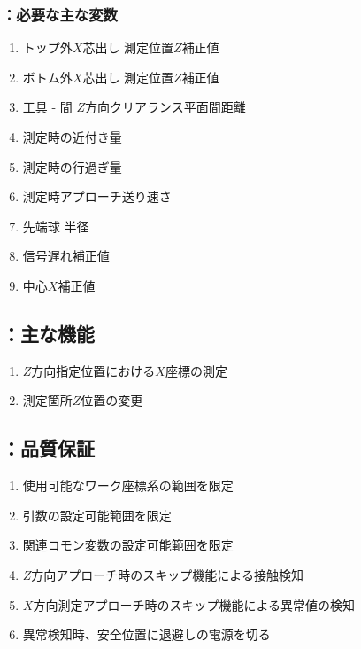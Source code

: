 \subsubsection{\MXIface：必要な主な変数}
\begin{enumerate}[label*=\sarrow]
\item トップ外$X$芯出し 測定位置$Z$補正値
\item ボトム外$X$芯出し 測定位置$Z$補正値
\item 工具 - \EndFace 間 $Z$方向クリアランス平面間距離
\item \TouchSensorProbe 測定時の近付き量
\item \TouchSensorProbe 測定時の行過ぎ量
\item \TouchSensorProbe 測定時アプローチ送り速さ
\item \TouchSensorProbe 先端球 半径
\item \TouchSensorProbe 信号遅れ補正値
\item \TouchSensorProbe 中心$X$補正値
\end{enumerate}


\subsection{\MXIface：主な機能}
\begin{enumerate}[label*=\sarrow]
\item $Z$方向指定位置における\OutcutCenter$X$座標の測定
\item 測定箇所$Z$位置の変更
\end{enumerate}


\clearpage
\subsection{\MXIface：品質保証}
\begin{enumerate}[label*=\sarrow]
\item 使用可能なワーク座標系の範囲を限定
\item {}引数の設定可能範囲を限定
\item 関連コモン変数の設定可能範囲を限定
\item $Z$方向アプローチ時のスキップ機能による接触検知
\item $X$方向測定アプローチ時のスキップ機能による異常値の検知
\item 異常検知時、安全位置に退避し\TouchSensorProbe の電源を切る
\end{enumerate}



